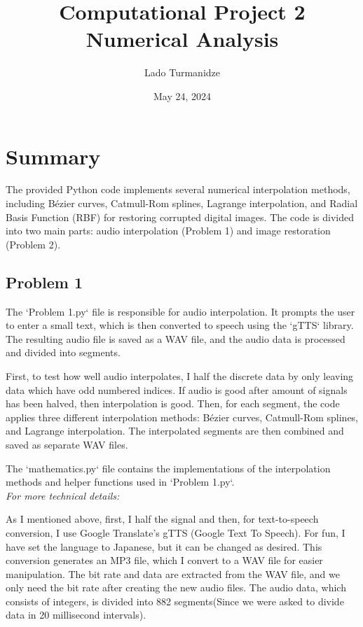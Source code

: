 \documentclass{article}
\title{Computational Project 2\\\large Numerical Analysis}
\author{Lado Turmanidze}
\date{May 24, 2024}
\begin{document}
	\maketitle
	
	\section*{Summary}
	
	The provided Python code implements several numerical interpolation methods, including Bézier curves, Catmull-Rom splines, Lagrange interpolation, and Radial Basis Function (RBF) for restoring corrupted digital images. The code is divided into two main parts: audio interpolation (Problem 1) and image restoration (Problem 2).
	
	\subsection*{Problem 1}
	
	The `Problem 1.py` file is responsible for audio interpolation. It prompts the user to enter a small text, which is then converted to speech using the `gTTS` library. The resulting audio file is saved as a WAV file, and the audio data is processed and divided into segments.
	
	First, to test how well audio interpolates, I half the discrete data by only leaving data which have odd numbered indices. If audio is good after amount of signals has been halved, then interpolation is good. Then, for each segment, the code applies three different interpolation methods: Bézier curves, Catmull-Rom splines, and Lagrange interpolation. The interpolated segments are then combined and saved as separate WAV files.
	
	The `mathematics.py` file contains the implementations of the interpolation methods and helper functions used in `Problem 1.py`. \\
	
	
	\textit{For more technical details:}
	
	
	As I mentioned above, first, I half the signal and then, for text-to-speech conversion, I use Google Translate's gTTS (Google Text To Speech). For fun, I have set the language to Japanese, but it can be changed as desired. This conversion generates an MP3 file, which I convert to a WAV file for easier manipulation. The bit rate and data are extracted from the WAV file, and we only need the bit rate after creating the new audio files. The audio data, which consists of integers, is divided into 882 segments(Since we were asked to divide data in 20 millisecond intervals).
	
\end{document}
